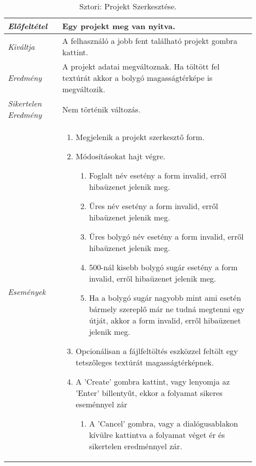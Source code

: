 \begin{table}[H]
	\centering
	\begin{tabular}{ | m{} | m{} | }
		\hline
		\emph{Előfeltétel} & Egy projekt meg van nyitva.  \\
		\hline
		\emph{Kiváltja} & A felhasználó a jobb fent található projekt gombra kattint. \\
		\hline
		\emph{Eredmény} & A projekt adatai megváltoznak. Ha töltött fel textúrát akkor a bolygó magasságtérképe is megváltozik.    \\
		\hline
		\emph{Sikertelen Eredmény} & Nem történik változás.  \\
		\hline
		\hline
		\emph{Események} &

		\begin{enumerate}[itemsep=-1ex]
			\item Megjelenik a projekt szerkesztő form.
			\item Módosításokat hajt végre.
			\begin{enumerate}[itemsep=-1ex]
				\item Foglalt név esetény a form invalid, erről hibaüzenet jelenik meg.
				\item Üres név esetény a form invalid, erről hibaüzenet jelenik meg.
				\item Üres bolygó név esetény a form invalid, erről hibaüzenet jelenik meg.
				\item 500-nál kisebb bolygó sugár esetény a form invalid, erről hibaüzenet jelenik meg.
				\item Ha a bolygó sugár nagyobb mint ami esetén bármely szereplő már ne tudná megtenni egy útját, akkor a form invalid, erről hibaüzenet jelenik meg.
			\end{enumerate}
			\item Opcionálisan a fájlfeltöltés eszközzel feltölt egy tetszőleges textúrát magasságtérképnek.
			\item A 'Create' gombra kattint, vagy lenyomja az 'Enter' billentyűt, ekkor a folyamat sikeres eseménnyel zár
			\begin{enumerate}[itemsep=-1ex]
				\item A 'Cancel' gombra, vagy a dialógusablakon kívülre kattintva a folyamat véget ér és sikertelen eredménnyel zár.
			\end{enumerate}
		\end{enumerate}

		\\
		\hline
	\end{tabular}
	\caption{Sztori: Projekt Szerkesztése.}
	\label{tab:story-project-edit}
\end{table}


